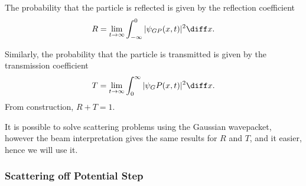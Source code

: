 \documentclass[12pt]{article}
\begin{document}
\begin{definition}
	The probability that the particle is reflected is given by the reflection coefficient
	\[
		R = \lim_{t \to \infty}\int_{-\infty}^{0} |\psi_{GP}(x, t)|^2\diff x
	.\]

	Similarly, the probability that the particle is transmitted is given by the transmission coefficient
	\[
		T = \lim_{t \to \infty} \int_{0}^{\infty} |\psi_GP(x, t)|^2\diff x
	.\]
	From construction, $R + T = 1$.
\end{definition}

It is possible to solve scattering problems using the Gaussian wavepacket, however the beam interpretation gives the same results for $R$ and $T$, and it easier, hence we will use it.

\subsubsection{Scattering off Potential Step}%
\label{subsub:scattering_off_potential_step}
\end{document}
